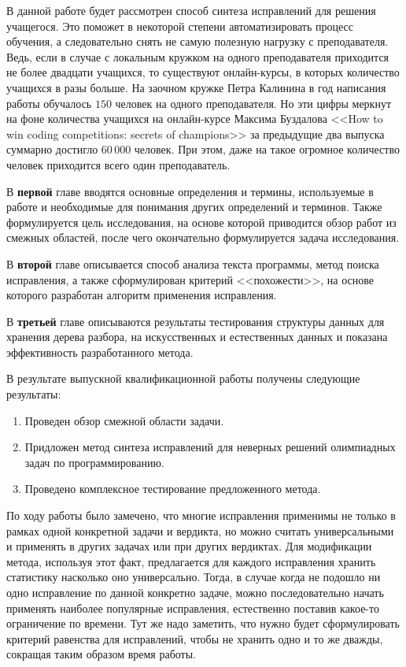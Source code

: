 \documentclass[times,specification,annotation]{itmo-student-thesis}
\begin{document}
В данной работе будет рассмотрен способ синтеза исправлений для решения учащегося. Это поможет в некоторой
степени автоматизировать процесс обучения, а следовательно снять не самую полезную нагрузку с преподавателя.
Ведь, если в случае с локальным кружком на одного преподавателя приходится не более двадцати учащихся, то существуют
онлайн-курсы, в которых количество учащихся в разы больше. На заочном кружке Петра Калинина в год написания работы
обучалось $150$ человек на одного преподавателя. Но эти цифры меркнут на фоне количества учащихся на онлайн-курсе 
Максима Буздалова <<How to win coding competitions: secrets of champions>> за предыдущие два выпуска суммарно достигло 
$60\,000$ человек. При этом, даже на такое огромное количество человек приходится всего один преподаватель.

В \textbf{первой} главе вводятся основные определения и термины, используемые в работе и необходимые
для понимания других определений и терминов. Также формулируется цель исследования, на основе которой
приводится обзор работ из смежных областей, после чего окончательно формулируется задача исследования.

В \textbf{второй} главе описывается способ анализа текста программы, метод поиска исправления, а также
сформулирован критерий <<похожести>>, на основе которого разработан алгоритм применения исправления.

В \textbf{третьей} главе описываются результаты тестирования структуры данных для хранения дерева разбора,
на искусственных и естественных данных и показана эффективность разработанного метода.






\startconclusionpage

В результате выпускной квалификационной работы получены следующие результаты:
\begin{enumerate}
    \item Проведен обзор смежной области задачи.
    \item Придложен метод синтеза исправлений для неверных решений олимпиадных задач по программированию.
    \item Проведено комплексное тестирование предложенного метода.
\end{enumerate}

По ходу работы было замечено, что многие исправления применимы не только в рамках одной конкретной задачи и вердикта,
но можно считать универсальными и применять в других задачах или при других вердиктах. Для модификации метода, используя
этот факт, предлагается для каждого исправления хранить статистику насколько оно универсально. Тогда, в случае когда
не подошло ни одно исправление по данной конкретно задаче, можно последовательно начать применять наиболее популярные исправления,
естественно поставив какое-то ограничение по времени. Тут же надо заметить, что нужно будет сформулировать критерий равенства
для исправлений, чтобы не хранить одно и то же дважды, сокращая таким образом время работы. 
\end{document}
